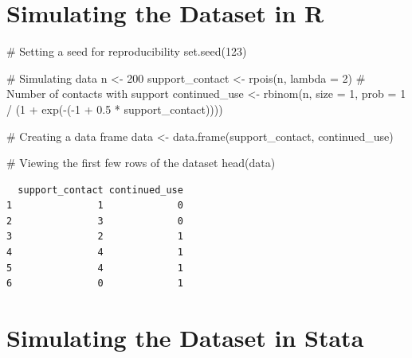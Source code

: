 \documentclass[
  letterpaper,
  DIV=11,
  numbers=noendperiod]{scrreprt}
\newenvironment{Shaded}{\begin{snugshade}}{\end{snugshade}}
\newcommand{\AttributeTok}[1]{\textcolor[rgb]{0.40,0.45,0.13}{#1}}
\newcommand{\CommentTok}[1]{\textcolor[rgb]{0.37,0.37,0.37}{#1}}
\newcommand{\DecValTok}[1]{\textcolor[rgb]{0.68,0.00,0.00}{#1}}
\newcommand{\FloatTok}[1]{\textcolor[rgb]{0.68,0.00,0.00}{#1}}
\newcommand{\FunctionTok}[1]{\textcolor[rgb]{0.28,0.35,0.67}{#1}}
\newcommand{\NormalTok}[1]{\textcolor[rgb]{0.00,0.23,0.31}{#1}}
\newcommand{\OtherTok}[1]{\textcolor[rgb]{0.00,0.23,0.31}{#1}}
\newcommand{\SpecialCharTok}[1]{\textcolor[rgb]{0.37,0.37,0.37}{#1}}
\begin{document}
\section{Simulating the Dataset in
R}\label{simulating-the-dataset-in-r-1}

\begin{Shaded}
\begin{Highlighting}[]
\CommentTok{\# Setting a seed for reproducibility}
\FunctionTok{set.seed}\NormalTok{(}\DecValTok{123}\NormalTok{)}

\CommentTok{\# Simulating data}
\NormalTok{n }\OtherTok{\textless{}{-}} \DecValTok{200}
\NormalTok{support\_contact }\OtherTok{\textless{}{-}} \FunctionTok{rpois}\NormalTok{(n, }\AttributeTok{lambda =} \DecValTok{2}\NormalTok{)  }\CommentTok{\# Number of contacts with support}
\NormalTok{continued\_use }\OtherTok{\textless{}{-}} \FunctionTok{rbinom}\NormalTok{(n, }\AttributeTok{size =} \DecValTok{1}\NormalTok{, }\AttributeTok{prob =} \DecValTok{1} \SpecialCharTok{/}\NormalTok{ (}\DecValTok{1} \SpecialCharTok{+} \FunctionTok{exp}\NormalTok{(}\SpecialCharTok{{-}}\NormalTok{(}\SpecialCharTok{{-}}\DecValTok{1} \SpecialCharTok{+} \FloatTok{0.5} \SpecialCharTok{*}\NormalTok{ support\_contact))))}

\CommentTok{\# Creating a data frame}
\NormalTok{data }\OtherTok{\textless{}{-}} \FunctionTok{data.frame}\NormalTok{(support\_contact, continued\_use)}

\CommentTok{\# Viewing the first few rows of the dataset}
\FunctionTok{head}\NormalTok{(data)}
\end{Highlighting}
\end{Shaded}

\begin{verbatim}
  support_contact continued_use
1               1             0
2               3             0
3               2             1
4               4             1
5               4             1
6               0             1
\end{verbatim}

\section{Simulating the Dataset in
Stata}\label{simulating-the-dataset-in-stata-1}
\end{document}
